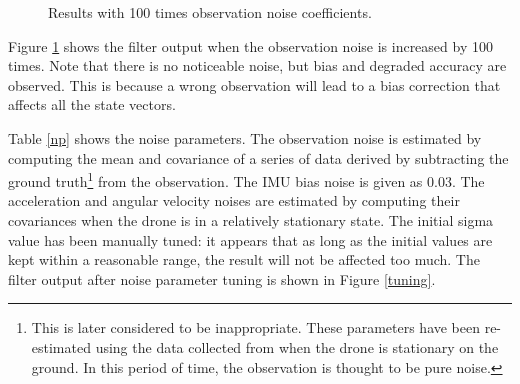 \documentclass[letter, 10pt]{article}
\begin{document}
\begin{onehalfspacing}
\begin{figure}[h]
	\centering
	\caption{Results with 100 times observation noise coefficients.}
	\label{highr}
\end{figure}

Figure \ref{highr} shows the filter output when the observation noise is increased by 100 times. Note that there is no noticeable noise, but bias and degraded accuracy are observed. This is because a wrong observation will lead to a bias correction that affects all the state vectors. 

Table \ref{np} shows the noise parameters. The observation noise is estimated by computing the mean and covariance of a series of data derived by subtracting the ground truth\footnote{This is later considered to be inappropriate. These parameters have been re-estimated using the data collected from when the drone is stationary on the ground. In this
period of time, the observation is thought to be pure noise. 
} from the observation. The IMU bias noise is given as 0.03. The acceleration and angular velocity noises are estimated by computing their covariances when the drone is in a relatively stationary state. The initial sigma value has been manually tuned: it appears that as long as the initial values are kept within a reasonable range, the result 
will not be affected too much. The filter output after noise parameter tuning is shown in Figure \ref{tuning}.


\end{onehalfspacing}
\end{document}
